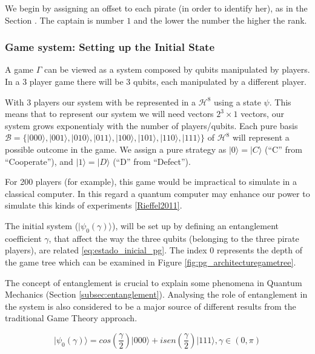 We begin by assigning an offset to each pirate (in order to identify her), as in the Section \label{subsec:description}. The captain is number $1$ and the lower the number the higher the rank. 



\subsubsection{Game system: Setting up the Initial State}
\label{subsec:pirates_initialstate}

A game $\Gamma$ can be viewed as a system composed by qubits manipulated by players. In a $3$ player game there will be $3$ qubits, each manipulated by a different player. 

With $3$ players our system with be represented in a $\mathcal{H}^{8}$ using a state $\psi$. This means that to represent our system we will need vectors $2^{3}\times 1$ vectors, our system grows exponentialy with the number of players/qubits. Each pure basis $\mathcal{B}= \{ \vert 000\rangle , \vert 001\rangle , \vert 010\rangle , \vert 011\rangle , \vert 100\rangle , \vert 101\rangle , \vert 110\rangle , \vert 111\rangle \}$ of $\mathcal{H}^{8}$ will represent a possible outcome in the game. We assign a pure strategy as $\vert 0\rangle = \vert C\rangle$ (``C'' from ``Cooperate''), and $\vert 1\rangle = \vert D\rangle$ (``D'' from ``Defect'').

For 200 players (for example), this game would be impractical to simulate in a classical computer. In this regard a quantum computer may enhance our power to simulate this kinds of experiments \ref{Rieffel2011}.


The initial system ($\vert \psi_{0}(\gamma) \rangle$), will be set up by defining an entanglement coefficient $\gamma$, that affect the way the three qubits (belonging to the three pirate players), are related \ref{eq:estado_inicial_pg}. The index $0$ represents the depth of the game tree which can be examined in Figure \ref{fig:pg_architecturegametree}.


The concept of entanglement is crucial to explain some phenomena in Quantum Mechanics (Section \ref{subsec:entanglement}). Analysing the role of entanglement in the system is also considered to be a major source of different results from the traditional Game Theory approach\cite{Fra2011a}\cite{Fra2011}\cite{Letters2002}\cite{Khan2011}\cite{Ricketts2006}. 
 
\begin{equation}
\label{eq:estado_inicial_pg}
\vert \psi_{0}(\gamma) \rangle= cos(\frac{ \gamma}{2})\vert 000\rangle+ isen(\frac{\gamma}{2})\vert 111 \rangle, \gamma \in (0,\pi)
\end{equation}


